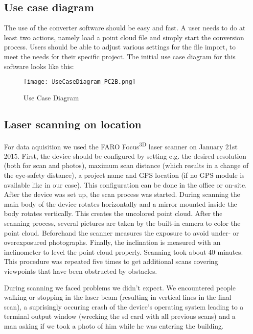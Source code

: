\subsection{Use case diagram}

The use of the converter software should be easy and fast. A user needs to do at least two actions, namely load a point cloud file and simply start the conversion process. Users should be able to adjust various settings for the file import, to meet the needs for their specific project. The initial use case diagram for this software looks like this:

\begin{figure}[h]
	\centering
	\texttt{[image: UseCaseDiagram\_PC2B.png]}
	\caption{Use Case Diagram}
	\label{fig:use_case}
\end{figure}


\subsection{Laser scanning on location}

For data aquisition we used the FARO Focus\textsuperscript{3D} laser scanner on January 21st 2015. First, the device should be configured by setting e.g. the desired resolution (both for scan and photos), maximum scan distance (which results in a change of the eye-safety distance), a project name and GPS location (if no GPS module is available like in our case). This configuration can be done in the office or on-site. After the device was set up, the scan process was started. During scanning the main body of the device rotates horizontally and a mirror mounted inside the body rotates vertically. This creates the uncolored point cloud. After the scanning process, several pictures are taken by the built-in camera to color the point cloud. Beforehand the scanner measures the exposure to avoid under- or overexposured photographs. Finally, the inclination is measured with an inclinometer to level the point cloud properly. Scanning took about 40 minutes.
This procedure was repeated five times to get additional scans covering viewpoints that have been obstructed by obstacles.

During scanning we faced problems we didn't expect. We encountered people walking or stopping in the laser beam (resulting in vertical lines in the final scan), a suprisingly occuring crash of the device's operating system leading to a terminal output window (wrecking the sd card with all previous scans) and a man asking if we took a photo of him while he was entering the building.

